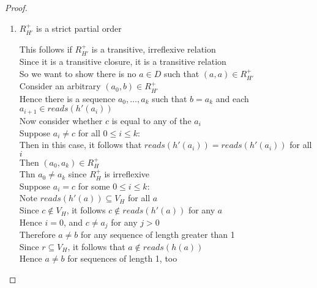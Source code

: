 \begin{proof}
\begin{enumerate}
\item $R^+_{H'}$ is a strict partial order 
  \begin{tabbedproof}
    \oo This follows if $R^+_{H'}$ is a transitive, irreflexive relation \\
    \oo Since it is a transitive closure, it is a transitive relation \\
    \oo So we want to show there is no $a \in D$ such that $(a,a) \in R^+_{H'}$ \\
    \oo Consider an arbitrary $(a_0, b) \in R^+_{H'}$ \\
    \oo Hence there is a sequence $a_0, \ldots, a_k$ such that $b = a_k$ and each $a_{i+1} \in \mathit{reads}(h'(a_i))$ \\
    \oo Now consider whether $c$ is equal to any of the $a_i$ \\
    \oo Suppose $a_i \not= c$ for all $0 \leq i \leq k$: \\
    \ooo Then in this case, it follows that $\mathit{reads}(h'(a_i)) = \mathit{reads}(h'(a_i))$ for all $i$\\
    \ooo Then $(a_0, a_k) \in R^+_H$ \\
    \ooo Thn $a_0 \not= a_k$ since $R^+_H$ is irreflexive \\
    \oo Suppose $a_i = c$ for some $0 \leq i \leq k$: \\
    \ooo Note $\mathit{reads}(h'(a)) \subseteq V_H$ for all $a$  \\
    \ooo Since $c \not\in V_H$, it follows $c \not\in \mathit{reads}(h'(a))$ for any $a$ \\
    \ooo Hence $i = 0$, and $c \not= a_j$ for any $j > 0$ \\
    \ooo Therefore $a \not= b$ for any sequence of length greater than 1 \\
    \ooo Since $r \subseteq V_H$, it follows that  $a \not\in \mathit{reads}(h(a))$ \\
    \ooo Hence $a \not= b$ for sequences of length 1, too \\
  \end{tabbedproof}


\end{enumerate}
\end{proof}

